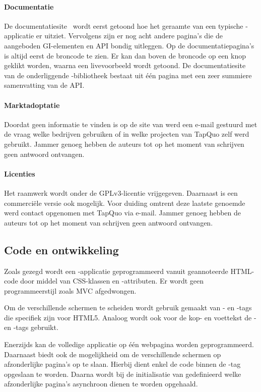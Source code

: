 \paragraph{Documentatie}
De documentatiesite~\cite{Lungo2013} wordt eerst getoond hoe het geraamte van een typische \lungo{}-applicatie er uitziet.
Vervolgens zijn er nog acht andere pagina's die de aangeboden GI-elementen en API bondig uitleggen.
Op de documentatiepagina's is altijd eerst de broncode te zien.
Er kan dan boven de broncode op een knop geklikt worden, waarna een livevoorbeeld wordt getoond.
De documentatiesite~\cite{TapQuo2013c} van de onderliggende \js{}-bibliotheek bestaat uit één pagina met een zeer summiere samenvatting van de API.

\paragraph{Marktadoptatie}
Doordat geen informatie te vinden is op de site van \lungo{} werd een e-mail gestuurd met de vraag welke bedrijven \lungo{} gebruiken of in welke projecten van TapQuo zelf \lungo{} werd gebruikt.
Jammer genoeg hebben de auteurs tot op het moment van schrijven geen antwoord ontvangen.

\paragraph{Licenties}
Het raamwerk wordt onder de GPLv3-licentie vrijgegeven.
Daarnaast is een commerciële versie ook mogelijk.
Voor duiding omtrent deze laatste genoemde werd contact opgenomen met TapQuo via e-mail.
Jammer genoeg hebben de auteurs tot op het moment van schrijven geen antwoord ontvangen.

\subsection{Code en ontwikkeling}
Zoals gezegd wordt een \lungo{}-applicatie geprogrammeerd vanuit geannoteerde HTML-code door middel van CSS-klassen en -attributen.
Er wordt geen programmeerstijl zoals MVC afgedwongen.

Om de verschillende schermen te scheiden wordt gebruik gemaakt van - en -tags die specifiek zijn voor HTML5.
Analoog wordt ook voor de kop- en voettekst de - en -tags gebruikt.

Enerzijds kan de volledige applicatie op één webpagina worden geprogrammeerd.
Daarnaast biedt \lungo{} ook de mogelijkheid om de verschillende schermen op afzonderlijke pagina's op te slaan.
Hierbij dient enkel de code binnen de -tag opgeslaan te worden.
Daarna wordt bij de initialisatie van \lungo{} gedefinieerd welke afzonderlijke pagina's asynchroon dienen te worden opgehaald.

